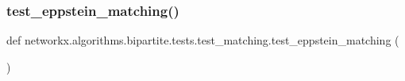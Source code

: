 \subsubsection{\texorpdfstring{test\+\_\+eppstein\+\_\+matching()}{test\_eppstein\_matching()}}
{\footnotesize\ttfamily def networkx.\+algorithms.\+bipartite.\+tests.\+test\+\_\+matching.\+test\+\_\+eppstein\+\_\+matching (\begin{DoxyParamCaption}{ }\end{DoxyParamCaption})}

 